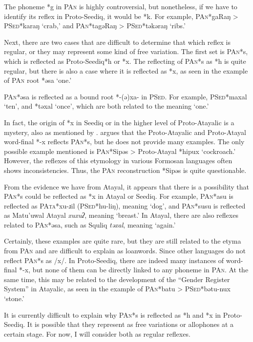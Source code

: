 \documentclass[12pt]{article}
\newcommand{\pan}{\textsc{PAn}\xspace}
\newcommand{\pata}{\textsc{PAta}\xspace}
\newcommand{\psed}{\textsc{PSed}\xspace}
\newcommand{\psedf}{Proto-Seediq\xspace}
\begin{document}
The phoneme *g in \pan is highly controversial, but nonetheless, if we have to identify its reflex in \psedf, it would be *k. For example, \pan *gaRaŋ > \psed *karaŋ `crab,' and \pan *tagəRaŋ > \psed *təkəraŋ `ribs.'

Next, there are two cases that are difficult to determine that which reflex is regular, or they may represent some kind of free variation. The first set is \pan *s, which is reflected as \psedf *h or *x. The reflecting of \pan *s as *h is quite regular, but there is also a case where it is reflected as *x, as seen in the example of \pan root *əsa `one.'

\pan *əsa is reflected as a bound root *-(ə)xa- in \psed. For example, \psed *maxal `ten', and *təxal `once', which are both related to the meaning `one.' 

In fact, the origin of *x in Seediq or in the higher level of Proto-Atayalic is a mystery, also as mentioned by \textcite[263]{li1981paic}. \textcite[144]{goderich2020phd} argues that the Proto-Atayalic and Proto-Atayal word-final *-x reflects \pan *s, but he does not provide many examples. The only possible example mentioned is \pan *Sipəs > Proto-Atayal *hipux `cockroach.' However, the reflexes of this etymology in various Formosan languages often shows inconsistencies. Thus, the \pan reconstruction *Sipəs is quite questionable.

From the evidence we have from Atayal, it appears that there is a possibility that \pan *s could be reflected as *x in Atayal or Seediq. For example, \pan *asu is reflected as \pata *xu-ɹil (\psed *hu-liŋ), meaning `dog', and \pan *susu is reflected as Matu'uwal Atayal \textit{xuxuʔ}, meaning `breast.' In Atayal, there are also reflexes related to \pan *əsa, such as Squliq \textit{təxal}, meaning `again.'

Certainly, these examples are quite rare, but they are still related to the etyma from \pan and are difficult to explain as loanwords. Since other languages do not reflect \pan *s as /x/. In \psedf, there are indeed many instances of word-final *-x, but none of them can be directly linked to any phoneme in \pan. At the same time, this may be related to the development of the ``Gender Register System'' in Atayalic, as seen in the example of \pan *batu > \psed *bətu-nux `stone.'

It is currently difficult to explain why \pan *s is reflected as *h and *x in \psedf. It is possible that they represent as free variations or allophones at a certain stage. For now, I will consider both as regular reflexes.
\end{document}
